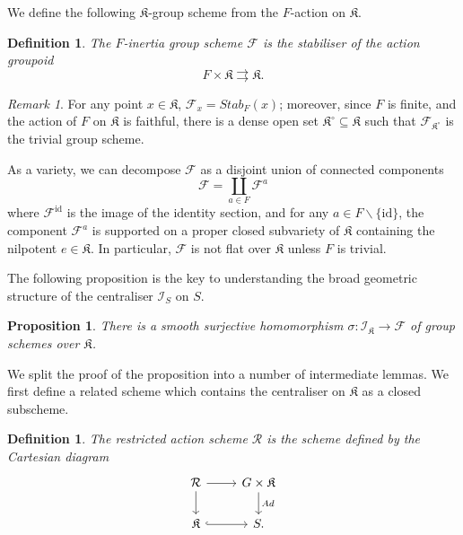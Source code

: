 \documentclass{amsart}
\newtheorem{proposition}[theorem]{Proposition}
\newtheorem{definition}[theorem]{Definition}
\theoremstyle{remark}
\newtheorem{remark}[theorem]{Remark}
\numberwithin{theorem}{section}
\numberwithin{equation}{section}
\begin{document}
We define the following $\mathfrak{K}$-group scheme from the $F$-action on $\mathfrak{K}$.

\begin{definition}\label{FInertiadef}
    The \emph{$F$-inertia group scheme} $\mathcal F$ is the stabiliser of the action groupoid 
    \begin{equation}\label{FInertiaeqn}
        F \times \mathfrak{K} \rightrightarrows \mathfrak{K}.
    \end{equation}
\end{definition}

\begin{remark}\label{FInertia1rmk}
     For any point $x \in \mathfrak{K}$, $\mathcal F_x = Stab_F(x)$; moreover, since $F$ is finite, and the action of $F$ on $\mathfrak{K}$ is faithful, there is a dense open set $\mathfrak{K}^\circ \subseteq \mathfrak{K}$ such that $\mathcal F_{\mathfrak{K}^\circ}$ is the trivial group scheme.

    As a variety, we can decompose $\mathcal F$ as a disjoint union of connected components
    \begin{equation}\label{FInertia2eqn}
        \mathcal F = \coprod_{a \in F} \mathcal F^a
    \end{equation}
    where $\mathcal F^{\text{id}}$ is the image of the identity section, and for any $a \in F\backslash\{\text{id}\}$, the component $\mathcal F^a$ is supported on a proper closed subvariety of $\mathfrak{K}$ containing the nilpotent $e \in \mathfrak{K}$. In particular, $\mathcal F$ is not flat over $\mathfrak{K}$ unless $F$ is trivial.
\end{remark}

The following proposition is the key to understanding the broad geometric structure of the centraliser $\mathcal I_S$ on $S$.

\begin{proposition}\label{QuasiSteinHomprp}
    There is a smooth surjective homomorphism $\sigma:\mathcal I_{\mathfrak{K}} \rightarrow \mathcal F$ of group schemes over $\mathfrak{K}$.
\end{proposition}

We split the proof of the proposition into a number of intermediate lemmas. We first define a related scheme which contains the centraliser on $\mathfrak{K}$ as a closed subscheme.

\begin{definition}\label{RestrictedActiondef}
    The \emph{restricted action scheme} $\mathcal R$ is the scheme defined by the Cartesian diagram
    \begin{equation}\label{RestrictedAction1eqn}
        \begin{tikzcd}
            \mathcal R \arrow[d] \arrow[r] & G \times \mathfrak{K} \arrow[d, "Ad"] \\
            \mathfrak{K} \arrow[r, hook]   & S.                                    
        \end{tikzcd}
    \end{equation}
\end{definition}
\end{document}
